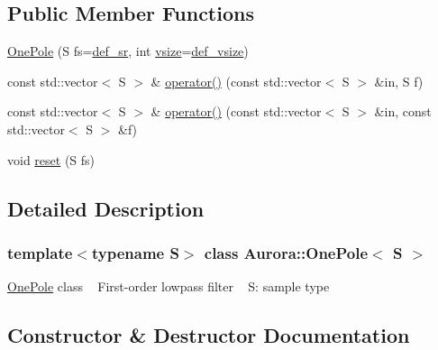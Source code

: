 \subsection*{Public Member Functions}
\begin{DoxyCompactItemize}
\item 
\hyperlink{class_aurora_1_1_one_pole_a58e01b113a37f1f05e4ae135acf056de}{One\+Pole} (S fs=\hyperlink{namespace_aurora_ad49263d809bea98dd422e95bc91bc03e}{def\+\_\+sr}, int \hyperlink{class_aurora_1_1_snd_base_af9e21aaf411b17f7a8221c991ce5d291}{vsize}=\hyperlink{namespace_aurora_afaaddf667a06e7ce23c667a8b7295263}{def\+\_\+vsize})
\item 
const std\+::vector$<$ S $>$ \& \hyperlink{class_aurora_1_1_one_pole_a34c297cdef0928ffd6e13e0603c5ef9d}{operator()} (const std\+::vector$<$ S $>$ \&in, S f)
\item 
const std\+::vector$<$ S $>$ \& \hyperlink{class_aurora_1_1_one_pole_ab126ef60b5f354c5aec0b62636bbb01d}{operator()} (const std\+::vector$<$ S $>$ \&in, const std\+::vector$<$ S $>$ \&f)
\item 
void \hyperlink{class_aurora_1_1_one_pole_ab9d69c4ceb9dbf5017fd800844f54dbf}{reset} (S fs)
\end{DoxyCompactItemize}


\subsection{Detailed Description}
\subsubsection*{template$<$typename S$>$\newline
class Aurora\+::\+One\+Pole$<$ S $>$}

\hyperlink{class_aurora_1_1_one_pole}{One\+Pole} class ~\newline
First-\/order lowpass filter ~\newline
S\+: sample type 

\subsection{Constructor \& Destructor Documentation}
\mbox{\label{class_aurora_1_1_one_pole_a58e01b113a37f1f05e4ae135acf056de}} 
